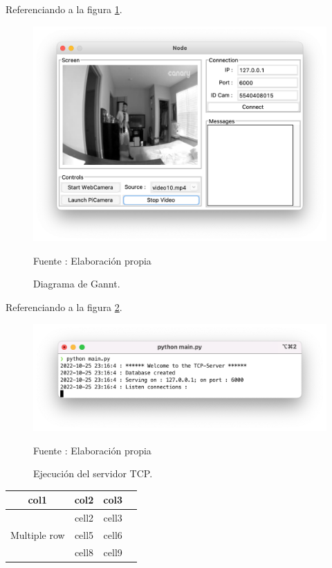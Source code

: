 Referenciando a la figura \ref{fig:securityvideo}.
\begin{figure}[H]
    \begin{center}
        \includegraphics[width=13cm]{img/capitulo_4/security-video.png}
        \caption{Diagrama de Gannt.}
        Fuente : Elaboración propia
        \label{fig:securityvideo}
    \end{center}
\end{figure}

Referenciando a la figura \ref{fig:servertcp_console}.
\begin{figure}[H]
    \begin{center}
        \includegraphics[width=15cm]{img/capitulo_4/tcp_server.png}
        \caption{Ejecución del servidor TCP.}
        Fuente : Elaboración propia
        \label{fig:servertcp_console}
    \end{center}
\end{figure}

\begin{center}
    \begin{tabular}{ |c|c|c|c| } 
    \hline
    \textbf{col1} & \textbf{col2} & \textbf{col3} \\
    \hline
    \multirow{3}{4em}{Multiple row} & cell2 & cell3 \\ 
    & cell5 & cell6  \\
    & cell8 & cell9 \\ 
    \hline
    \end{tabular}
\end{center}

